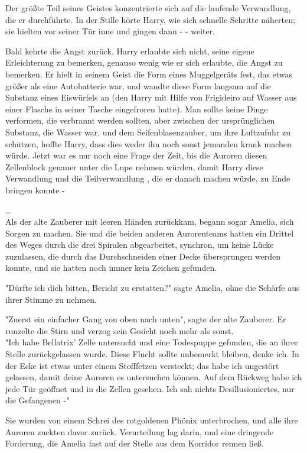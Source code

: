 {Der größte Teil seines Geistes konzentrierte sich auf die laufende Verwandlung, die er durchführte. In der Stille hörte Harry, wie sich schnelle Schritte näherten; sie hielten vor seiner Tür inne und gingen dann - - weiter.

Bald kehrte die Angst zurück. Harry erlaubte sich nicht, seine eigene Erleichterung zu bemerken, genauso wenig wie er sich erlaubte, die Angst zu bemerken. Er hielt in seinem Geist die Form eines Muggelgeräts fest, das etwas größer als eine Autobatterie war, und wandte diese Form langsam auf die Substanz eines Eiswürfels an (den Harry mit Hilfe von Frigideiro auf Wasser aus einer Flasche in seiner Tasche eingefroren hatte). Man sollte keine Dinge verformen, die verbrannt werden sollten, aber zwischen der ursprünglichen Substanz, die Wasser war, und dem Seifenblasenzauber, um ihre Luftzufuhr zu schützen, hoffte Harry, dass dies weder ihn noch sonst jemanden krank machen würde. Jetzt war es nur noch eine Frage der Zeit, bis die Auroren diesen Zellenblock genauer unter die Lupe nehmen würden, damit Harry diese Verwandlung und die Teilverwandlung , die er danach machen würde, zu Ende bringen konnte -

…\\ Als der alte Zauberer mit leeren Händen zurückkam, begann sogar Amelia, sich Sorgen zu machen. Sie und die beiden anderen Aurorenteams hatten ein Drittel des Weges durch die drei Spiralen abgearbeitet, synchron, um keine Lücke zuzulassen, die durch das Durchschneiden einer Decke übersprungen werden konnte, und sie hatten noch immer kein Zeichen gefunden.

"Dürfte ich dich bitten, Bericht zu erstatten?" sagte Amelia, ohne die Schärfe aus ihrer Stimme zu nehmen.

"Zuerst ein einfacher Gang von oben nach unten", sagte der alte Zauberer. Er runzelte die Stirn und verzog sein Gesicht noch mehr als sonst.\\ "Ich habe Bellatrix' Zelle untersucht und eine Todespuppe gefunden, die an ihrer Stelle zurückgelassen wurde. Diese Flucht sollte unbemerkt bleiben, denke ich. In der Ecke ist etwas unter einem Stofffetzen versteckt; das habe ich ungestört gelassen, damit deine Auroren es untersuchen können. Auf dem Rückweg habe ich jede Tür geöffnet und in die Zellen gesehen. Ich sah nichts Desillusioniertes, nur die Gefangenen -"

Sie wurden von einem Schrei des rotgoldenen Phönix unterbrochen, und alle ihre Auroren zuckten davor zurück. Verurteilung lag darin, und eine dringende Forderung, die Amelia fast auf der Stelle aus dem Korridor rennen ließ.

}
